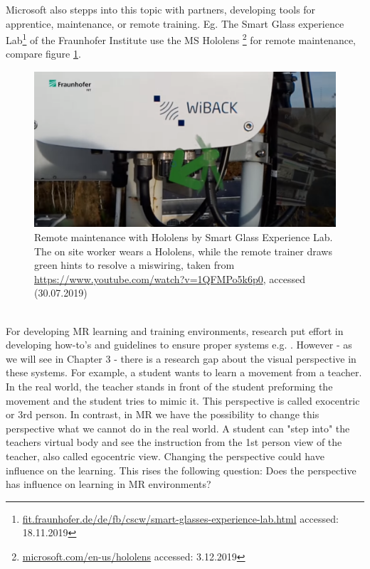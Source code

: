 Microsoft also stepps into this topic with partners, developing tools for apprentice, maintenance, or remote training. Eg. The Smart Glass experience Lab\footnote{\hyperlink{https://www.fit.fraunhofer.de/de/fb/cscw/smart-glasses-experience-lab.html}{fit.fraunhofer.de/de/fb/cscw/smart-glasses-experience-lab.html} accessed: 18.11.2019} of the Fraunhofer Institute use the MS Hololens \footnote{\hyperlink{https://www.microsoft.com/en-us/hololens}{microsoft.com/en-us/hololens} accessed: 3.12.2019} for remote maintenance, compare figure \ref{fig:fraunhofer}.
\begin{figure}
	\centering
	\includegraphics[width=1.0\textwidth]{img/fraunhofer.PNG}
	\caption{Remote maintenance with Hololens by Smart Glass Experience Lab. The on site worker wears a Hololens, while the remote trainer draws green hints to resolve a miswiring, taken from \hyperlink{https://www.youtube.com/watch?v=1QFMPo5k6p0}{https://www.youtube.com/watch?v=1QFMPo5k6p0}, accessed (30.07.2019)}
	\label{fig:fraunhofer}
\end{figure}\\
For developing MR learning and training environments, research put effort in developing how-to's and guidelines to ensure proper systems e.g. \cite{LaViola2017}. However - as we will see in Chapter 3 - there is a research gap about the visual perspective in these systems. For example, a student wants to learn a movement from a teacher. In the real world, the teacher stands in front of the student preforming the movement and the student tries to mimic it. This perspective is called exocentric or 3rd person. In contrast, in MR we have the possibility to change this perspective what we cannot do in the real world. A student can "step into" the teachers virtual body and see the instruction from the 1st person view of the teacher, also called egocentric view. Changing the perspective could have influence on the learning. This rises the following question: Does the perspective has influence on learning in MR environments? 
